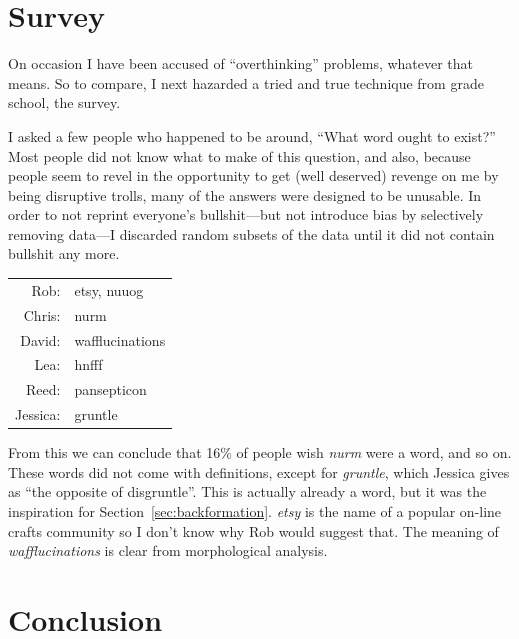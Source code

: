 \documentclass[twocolumn]{article}
\begin{document}
\section{Survey}

On occasion I have been accused of ``overthinking'' problems, whatever
that means. So to compare, I next hazarded a tried and true technique
from grade school, the survey.

I asked a few people who happened to be around, ``What word ought to
exist?'' Most people did not know what to make of this question, and
also, because people seem to revel in the opportunity to get (well
deserved) revenge on me by being disruptive trolls, many of the
answers were designed to be unusable. In order to not reprint
everyone's bullshit---but not introduce bias by selectively removing
data---I discarded random subsets of the data until it did not contain
bullshit any more.

\begin{center}
\begin{tabular}{rl}
Rob: &  etsy, nuuog \\
Chris: &  nurm \\
David: &  wafflucinations \\
Lea: &  hnfff \\
Reed: &  pansepticon \\
Jessica: &  gruntle \\
\end{tabular}
\end{center}

From this we can conclude that 16\% of people wish {\it nurm} were a word, and so on.
These words did not come with definitions, except for {\it gruntle}, which Jessica
gives as ``the opposite of disgruntle''. This is actually already a word, but
it was the inspiration for Section~\ref{sec:backformation}. {\it etsy} is the name
of a popular on-line crafts community so I don't know why Rob would suggest that.
The meaning of {\it wafflucinations} is clear from morphological analysis.






\section{Conclusion}
\end{document}
